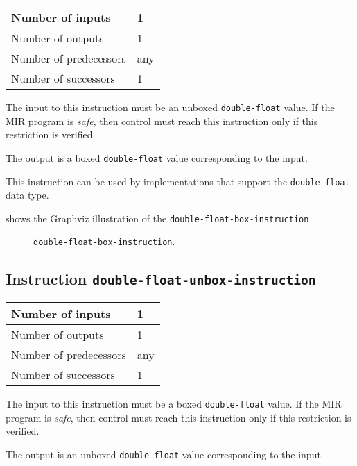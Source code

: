 \begin{tabular}{|l|l|}
\hline
Number of inputs & 1\\
\hline
Number of outputs & 1\\
\hline
Number of predecessors & any\\
\hline
Number of successors & 1\\
\hline
\end{tabular}

The input to this instruction must be an unboxed \texttt{double-float}
value.  If the MIR program is \emph{safe}, then control must reach
this instruction only if this restriction is verified.

The output is a boxed \texttt{double-float} value corresponding to the
input.

This instruction can be used by implementations that support the
\texttt{double-float} data type.   

 shows the Graphviz illustration of the
\texttt{double-float-box-instruction}

\begin{figure}
\begin{center}
\end{center}
\caption{\label{fig-double-float-box-instruction}
\texttt{double-float-box-instruction}.}
\end{figure}

\subsection{Instruction \texttt{double-float-unbox-instruction}}
\label{mir-instruction-double-float-unbox}

\begin{tabular}{|l|l|}
\hline
Number of inputs & 1\\
\hline
Number of outputs & 1\\
\hline
Number of predecessors & any\\
\hline
Number of successors & 1\\
\hline
\end{tabular}

The input to this instruction must be a boxed \texttt{double-float}
value.  If the MIR program is \emph{safe}, then control must reach
this instruction only if this restriction is verified.

The output is an unboxed \texttt{double-float} value corresponding to
the input.


